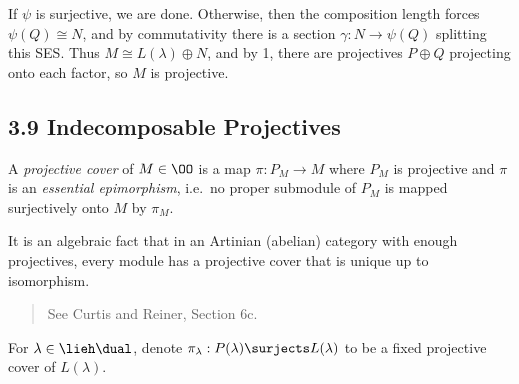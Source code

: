 \begin{description}
If \(\psi\) is surjective, we are done. Otherwise, then the composition
length forces \(\psi(Q) \cong N\), and by commutativity there is a
section \(\gamma: N \to \psi(Q)\) splitting this SES. Thus
\(M \cong L(\lambda) \oplus N\), and by 1, there are projectives
\(P \oplus Q\) projecting onto each factor, so \(M\) is projective.

\begin{center}
\end{center}
\end{description}

\hypertarget{indecomposable-projectives}{%
\subsection{3.9 Indecomposable
Projectives}\label{indecomposable-projectives}}

\begin{description}
\tightlist
\item[Definition (A Projective Cover)]
A \emph{projective cover} of \(M\in \OO\) is a map \(\pi: P_M \to M\)
where \(P_M\) is projective and \(\pi\) is an \emph{essential
epimorphism}, i.e.~no proper submodule of \(P_M\) is mapped surjectively
onto \(M\) by \(\pi_M\).
\end{description}

It is an algebraic fact that in an Artinian (abelian) category with
enough projectives, every module has a projective cover that is unique
up to isomorphism.

\begin{quote}
See Curtis and Reiner, Section 6c.
\end{quote}

\begin{description}
\tightlist
\item[Definition (The Projective Cover for a Weight)]
For \(\lambda \in \lieh\dual\), denote
\(\pi_\lambda: P(\lambda) \surjects L(\lambda)\) to be a fixed
projective cover of \(L(\lambda)\).
\end{description}


